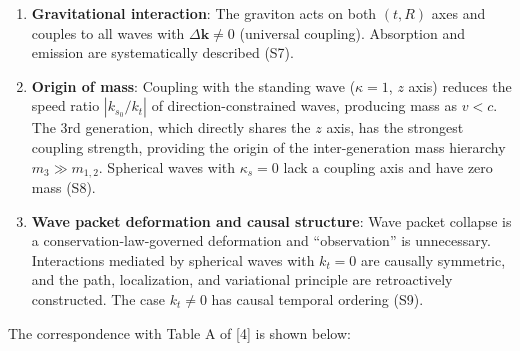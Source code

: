 \documentclass[
  a4paper,11pt]{article}
\theoremstyle{definition}
\theoremstyle{remark}
\begin{document}
\begin{enumerate}
  neutrinos. In addition to absorption and emission, \(W\) decay and
  inverse decay are unified as Type D/C. \(k_t \neq 0\) provides the
  origin of CP violation and the left-handed chirality selection rule
  (S6).
\item
  \textbf{Gravitational interaction}: The graviton acts on both
  \((t, R)\) axes and couples to all waves with
  \(\Delta\mathbf{k} \neq 0\) (universal coupling). Absorption and
  emission are systematically described (S7).
\item
  \textbf{Origin of mass}: Coupling with the standing wave
  (\(\kappa = 1\), \(z\) axis) reduces the speed ratio
  \(|k_{s_0} / k_t|\) of direction-constrained waves, producing mass as
  \(v < c\). The 3rd generation, which directly shares the \(z\) axis,
  has the strongest coupling strength, providing the origin of the
  inter-generation mass hierarchy \(m_3 \gg m_{1,2}\). Spherical waves
  with \(\kappa_s = 0\) lack a coupling axis and have zero mass (S8).
\item
  \textbf{Wave packet deformation and causal structure}: Wave packet
  collapse is a conservation-law-governed deformation and
  ``observation'' is unnecessary. Interactions mediated by spherical
  waves with \(k_t = 0\) are causally symmetric, and the path,
  localization, and variational principle are retroactively constructed.
  The case \(k_t \neq 0\) has causal temporal ordering (S9).
\end{enumerate}

The correspondence with Table A of {[}4{]} is shown below:
\end{document}
